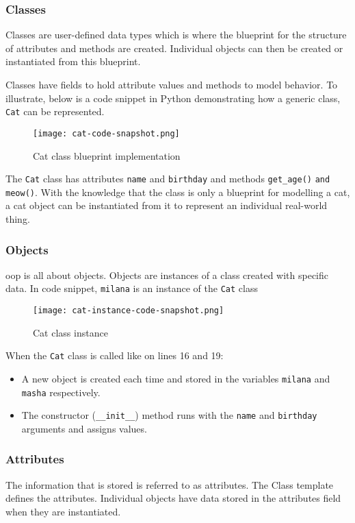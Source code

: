 \subsubsection{Classes}
Classes are user-defined data types which is where the blueprint for the structure of attributes and methods are created. Individual objects can then be created or instantiated from this blueprint.

Classes have fields to hold attribute values and methods to model behavior. To illustrate, below is a code snippet in Python demonstrating how a generic class, \verb+Cat+ can be represented.
\begin{figure}[h]
  \centering
  \texttt{[image: cat-code-snapshot.png]}
  \caption{Cat class blueprint implementation}
  \label{cat class blueprint}
\end{figure}

The \verb+Cat+ class has attributes \verb+name+ and \verb+birthday+ and methods \verb+get_age()+ \verb+and meow()+.
With the knowledge that the class is only a blueprint for modelling a cat, a cat object can be instantiated from it to represent an individual real-world thing.

\subsubsection{Objects}
\ac{oop} is all about objects. Objects are instances of a class created with specific data. In code snippet, \verb+milana+ is an instance of the \verb+Cat+ class
\begin{figure}[h]
  \centering
  \texttt{[image: cat-instance-code-snapshot.png]}
  \caption{Cat class instance}
  \label{cat class instance}
\end{figure}

When the \verb+Cat+ class is called like on lines 16 and 19:

\begin{itemize}
  \item A new object is created each time and stored in the variables \verb+milana+ and \verb+masha+ respectively.
  \item The constructor (\verb+__init__+) method runs with the \verb+name+ and \verb+birthday+ arguments and assigns values.
\end{itemize}

\subsubsection{Attributes}
The information that is stored is referred to as attributes. The Class template defines the attributes. Individual objects have data stored in the attributes field when they are instantiated.

